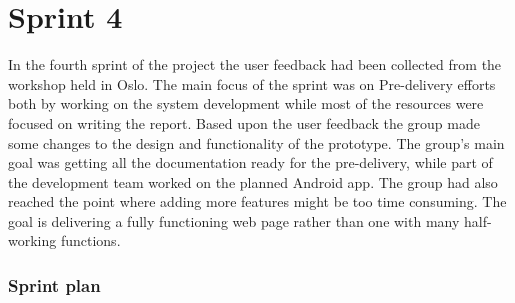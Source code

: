 \chapter{Sprint 4}
\label{chap:S4}

In the fourth sprint of the project the user feedback had been collected from the workshop held in Oslo. The main focus of the sprint was on Pre-delivery efforts both by working on the system development while most of the resources were focused on writing the report. Based upon the user feedback the group made some changes to the design and functionality of the prototype. The group's main goal was getting all the documentation ready for the pre-delivery, while part of the development team worked on the planned Android app. The group had also reached the point where adding more features might be too time consuming. The goal is delivering a fully functioning web page rather than one with many half-working functions.

\subsection{Sprint plan}
\label{subsec:S4Plan}

